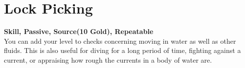 \section{Lock Picking}\label{sec:lockPicking}
\textbf{Skill, Passive, Source(10 Gold), Repeatable}\\
You can add your level to checks concerning moving in water as well as other fluids. This is also useful for diving for a long period of time, fighting against a current, or appraising how rough the currents in a body of water are.